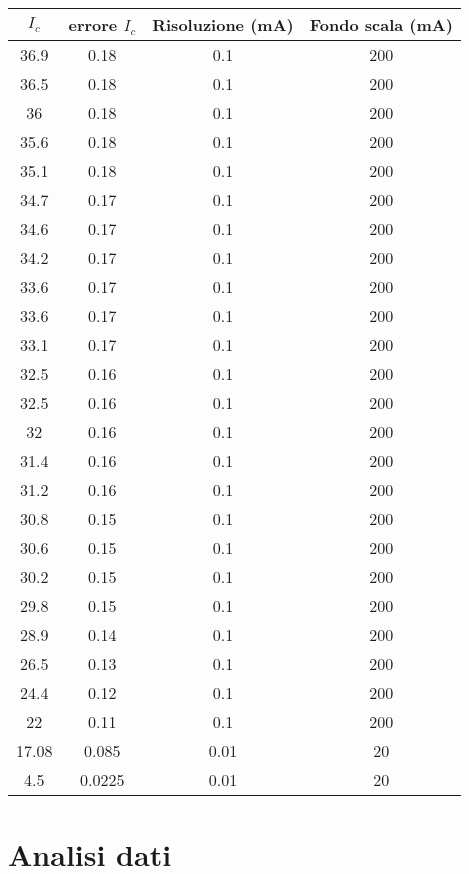 \documentclass{article}
\begin{document}
\begin{table}[H]
    \centering
    \begin{tabular}{|c|c|c|c|}
    \hline
    $I_c$ & errore $I_c$ & Risoluzione (mA) & Fondo scala (mA) \\ \hline
    36.9  & 0.18         & 0.1              & 200              \\ \hline
    36.5  & 0.18         & 0.1              & 200              \\ \hline
    36    & 0.18         & 0.1              & 200              \\ \hline
    35.6  & 0.18         & 0.1              & 200              \\ \hline
    35.1  & 0.18         & 0.1              & 200              \\ \hline
    34.7  & 0.17         & 0.1              & 200              \\ \hline
    34.6  & 0.17         & 0.1              & 200              \\ \hline
    34.2  & 0.17         & 0.1              & 200              \\ \hline
    33.6  & 0.17         & 0.1              & 200              \\ \hline
    33.6  & 0.17         & 0.1              & 200              \\ \hline
    33.1  & 0.17         & 0.1              & 200              \\ \hline
    32.5  & 0.16         & 0.1              & 200              \\ \hline
    32.5  & 0.16         & 0.1              & 200              \\ \hline
    32    & 0.16         & 0.1              & 200              \\ \hline
    31.4  & 0.16         & 0.1              & 200              \\ \hline
    31.2  & 0.16         & 0.1              & 200              \\ \hline
    30.8  & 0.15         & 0.1              & 200              \\ \hline
    30.6  & 0.15         & 0.1              & 200              \\ \hline
    30.2  & 0.15         & 0.1              & 200              \\ \hline
    29.8  & 0.15         & 0.1              & 200              \\ \hline
    28.9  & 0.14         & 0.1              & 200              \\ \hline
    26.5  & 0.13         & 0.1              & 200              \\ \hline
    24.4  & 0.12         & 0.1              & 200              \\ \hline
    22    & 0.11         & 0.1              & 200              \\ \hline
    17.08 & 0.085        & 0.01             & 20               \\ \hline
    4.5   & 0.0225       & 0.01             & 20               \\ \hline
    \end{tabular}
\end{table}


\section{Analisi dati}
\end{document}
